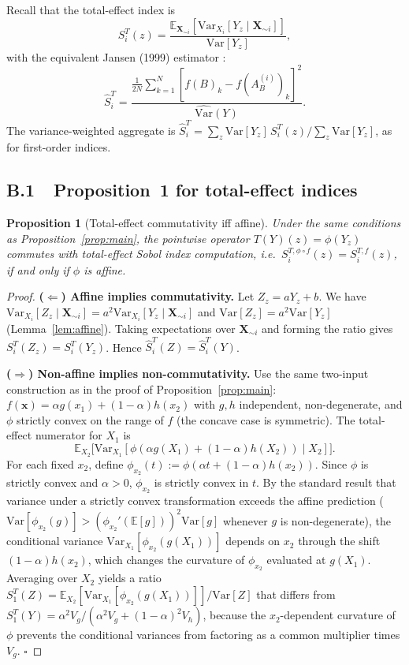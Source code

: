 \documentclass[11pt,onecolumn]{article}
\newtheorem{proposition}{Proposition}
\begin{document}
Recall that the total-effect index is
\[
  S_i^T(z) = \frac{\mathbb{E}_{\mathbf{X}_{\sim i}}[\mathrm{Var}_{X_i}[Y_z \mid \mathbf{X}_{\sim i}]]}
                  {\mathrm{Var}[Y_z]},
\]
with the equivalent Jansen (1999) estimator \citep{Homma1996,Saltelli2002}:
\begin{equation}
  \hat{S}_i^T
  = \frac{\frac{1}{2N}\sum_{k=1}^{N}[f(B)_k - f(A_B^{(i)})_k]^2}
         {\hat{\mathrm{Var}}(Y)}.
  \label{eq:jansen_st}
\end{equation}
The variance-weighted aggregate is $\hat{S}_i^T = \sum_z \mathrm{Var}[Y_z]\,S_i^T(z) / \sum_z \mathrm{Var}[Y_z]$,
as for first-order indices.

\subsection*{B.1\ \ Proposition~1 for total-effect indices}

\begin{proposition}[Total-effect commutativity iff affine]
\label{prop:main_T}
Under the same conditions as Proposition~\ref{prop:main}, the pointwise operator
$T(Y)(z) = \phi(Y_z)$ commutes with total-effect Sobol index computation,
i.e.\ $S_i^{T,\phi\circ f}(z) = S_i^{T,f}(z)$, if and only if $\phi$ is affine.
\end{proposition}

\begin{proof}
\textbf{($\Leftarrow$) Affine implies commutativity.}
Let $Z_z = aY_z + b$.  We have
$\mathrm{Var}_{X_i}[Z_z \mid \mathbf{X}_{\sim i}] = a^2 \mathrm{Var}_{X_i}[Y_z \mid \mathbf{X}_{\sim i}]$
and $\mathrm{Var}[Z_z] = a^2 \mathrm{Var}[Y_z]$ (Lemma~\ref{lem:affine}).
Taking expectations over $\mathbf{X}_{\sim i}$ and forming the ratio gives
$S_i^T(Z_z) = S_i^T(Y_z)$.  Hence $\hat{S}_i^T(Z) = \hat{S}_i^T(Y)$.

\textbf{($\Rightarrow$) Non-affine implies non-commutativity.}
Use the same two-input construction as in the proof of Proposition~\ref{prop:main}:
$f(\mathbf{x}) = \alpha g(x_1) + (1-\alpha)h(x_2)$ with $g, h$ independent,
non-degenerate, and $\phi$ strictly convex on the range of $f$ (the concave case
is symmetric).  The total-effect numerator for $X_1$ is
\[
  \mathbb{E}_{X_2}\bigl[\mathrm{Var}_{X_1}[\phi(\alpha g(X_1)+(1-\alpha)h(X_2)) \mid X_2]\bigr].
\]
For each fixed $x_2$, define $\phi_{x_2}(t) := \phi(\alpha t + (1-\alpha)h(x_2))$.
Since $\phi$ is strictly convex and $\alpha > 0$, $\phi_{x_2}$ is strictly
convex in $t$.  By the standard result that variance under a strictly convex
transformation exceeds the affine prediction
($\mathrm{Var}[\phi_{x_2}(g)] > (\phi_{x_2}'(\mathbb{E}[g]))^2 \mathrm{Var}[g]$
whenever $g$ is non-degenerate), the conditional variance
$\mathrm{Var}_{X_1}[\phi_{x_2}(g(X_1))]$ depends on $x_2$ through the shift
$(1-\alpha)h(x_2)$, which changes the curvature of $\phi_{x_2}$ evaluated at
$g(X_1)$.  Averaging over $X_2$ yields a ratio
$S_1^T(Z) = \mathbb{E}_{X_2}[\mathrm{Var}_{X_1}[\phi_{x_2}(g(X_1))]]/\mathrm{Var}[Z]$
that differs from $S_1^T(Y) = \alpha^2 V_g / (\alpha^2 V_g + (1-\alpha)^2 V_h)$,
because the $x_2$-dependent curvature of $\phi$ prevents the conditional
variances from factoring as a common multiplier times $V_g$.  $\square$
\end{proof}
\end{document}
